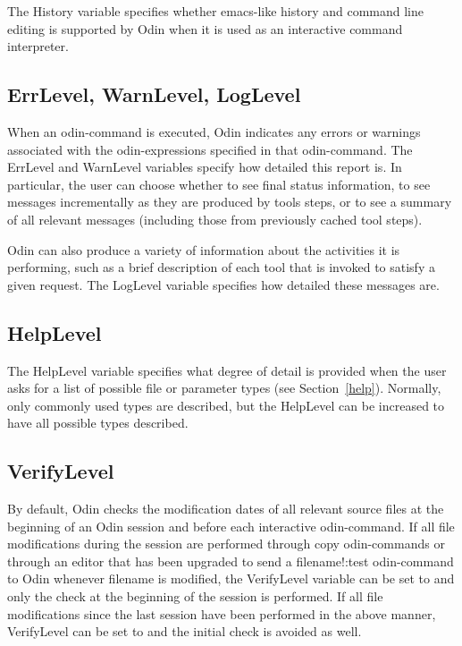 The {\ex History} variable specifies whether emacs-like 
history and command line editing is supported by Odin
when it is used as an interactive command interpreter.

\subsection{ErrLevel, WarnLevel, LogLevel}
\label{errlevel}

When an odin-command is executed, Odin indicates any errors or
warnings associated with the odin-expressions specified in that odin-command.
The {\ex ErrLevel} and {\ex WarnLevel} variables specify
how detailed this report is.
In particular, the user can choose whether
to see final status information,
to see messages incrementally as they are produced by tools steps,
or to see a summary of all relevant messages (including those from
previously cached tool steps).

Odin can also produce a variety of information about the activities
it is performing, such as a brief description of each tool that is
invoked to satisfy a given request.
The {\ex LogLevel} variable specifies how detailed these messages are.

\subsection{HelpLevel}
\label{helplevel}

The {\ex HelpLevel} variable specifies what degree of detail
is provided when the user asks for a list of possible
file or parameter types (see Section~\ref{help}).
Normally, only commonly used types are described, but the {\ex HelpLevel}
can be increased to have all possible types described.

\subsection{VerifyLevel}
\label{verifylevel}

By default, Odin checks the modification dates of all relevant source files
at the beginning of an Odin session and before each interactive odin-command.
If all file modifications during the session are performed through
copy odin-commands or through an editor that has been upgraded
to send a {\ex filename!:test} odin-command to Odin whenever {\ex filename}
is modified,
the {\ex VerifyLevel} variable can be set to {} and only the check
at the beginning of the session is performed.
If all file modifications since the last session have been performed
in the above manner,
{\ex VerifyLevel} can be set to {} and the initial check
is avoided as well.

